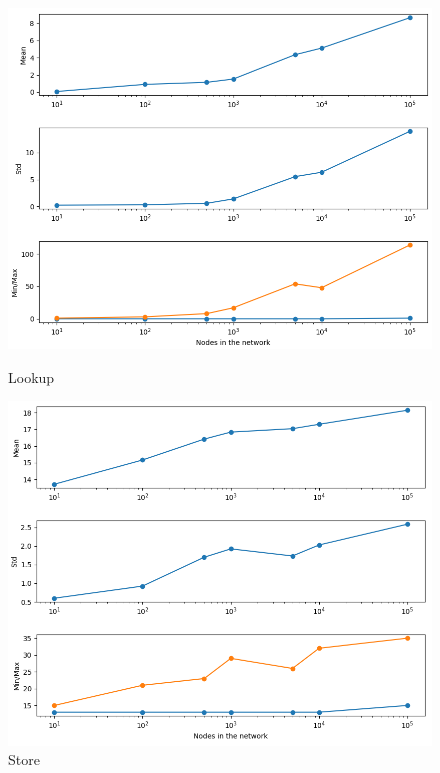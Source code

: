 \documentclass[a4paper, 12pt]{article} %
\begin{document}
\begin{figure}[ht]
  \centering
  \begin{minipage}[b]{0.49\textwidth}
    \includegraphics[width=\textwidth]{images/lookup_figure.png}
    \caption{Lookup}
  \end{minipage}
  \hfill
  \begin{minipage}[b]{0.49\textwidth}
    \includegraphics[width=\textwidth]{images/set_figure.png}
    \caption{Store}
  \end{minipage}
\end{figure}
\end{document}
